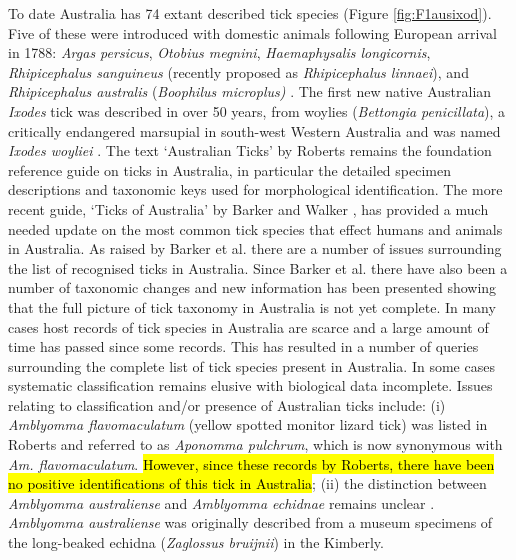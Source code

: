 \documentclass[a4paper, nobind]{templates/ociamthesis}
\begin{document}
To date Australia has 74 extant described tick species (Figure \ref{fig:F1ausixod}).
Five of these were introduced with domestic animals following European arrival in 1788: \emph{Argas persicus}, \emph{Otobius megnini}, \emph{Haemaphysalis longicornis}, \emph{Rhipicephalus sanguineus} (recently proposed as \emph{Rhipicephalus linnaei}), and \emph{Rhipicephalus australis} (\emph{Boophilus microplus)} \autocite{barkerTicksAustraliaSpecies2014}.
The first new native Australian \emph{Ixodes} tick was described in over 50 years, from woylies (\emph{Bettongia penicillata}), a critically endangered marsupial in south-west Western Australia and was named \emph{Ixodes woyliei} \autocite{ashMorphologicalMolecularDescription2017}.
The text `Australian Ticks' by Roberts \autocite*{robertsAustralianTicks1970} remains the foundation reference guide on ticks in Australia, in particular the detailed specimen descriptions and taxonomic keys used for morphological identification.
The more recent guide, `Ticks of Australia' by Barker and Walker \autocite*{barkerTicksAustraliaSpecies2014}, has provided a much needed update on the most common tick species that effect humans and animals in Australia.
As raised by Barker et al. \autocite*{barkerList70Species2014} there are a number of issues surrounding the list of recognised ticks in Australia.
Since Barker et al. \autocite*{barkerList70Species2014} there have also been a number of taxonomic changes and new information has been presented showing that the full picture of tick taxonomy in Australia is not yet complete.
In many cases host records of tick species in Australia are scarce and a large amount of time has passed since some records.
This has resulted in a number of queries surrounding the complete list of tick species present in Australia.
In some cases systematic classification remains elusive with biological data incomplete.
Issues relating to classification and/or presence of Australian ticks include:
(i) \emph{Amblyomma flavomaculatum} (yellow spotted monitor lizard tick) was listed in Roberts \autocite*{robertsAustralianSpeciesAponomma1953,robertsFurtherObservationsAustralian1964,robertsAustralianTicks1970} and referred to as \emph{Aponomma pulchrum}, which is now synonymous with \emph{Am. flavomaculatum}.
\hl{However, since these records by Roberts, there have been no positive identifications of this tick in Australia};
(ii) the distinction between \emph{Amblyomma australiense} and \emph{Amblyomma echidnae} remains unclear \autocite{guglielmoneCommentsControversialTick2009}. \emph{Amblyomma australiense} was originally described from a museum specimens of the long-beaked echidna (\emph{Zaglossus bruijnii}) in the Kimberly.
\end{document}
